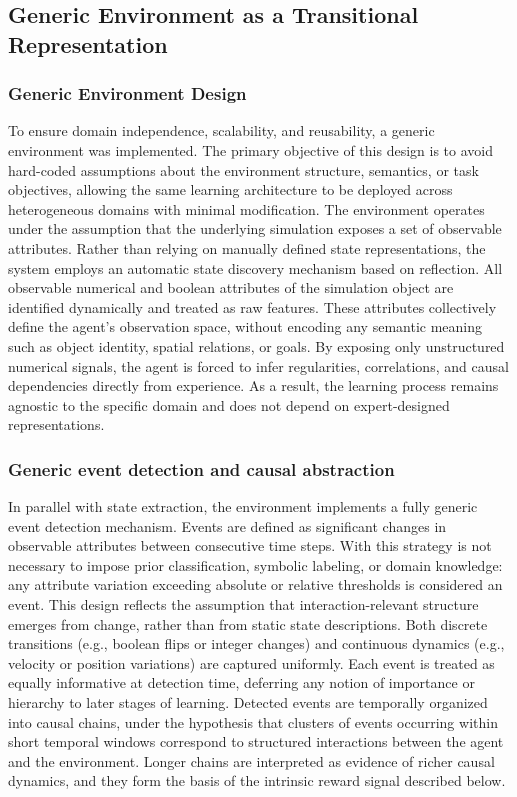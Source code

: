 \documentclass[12pt,a4paper]{report}
\begin{document}
\subsection{Generic Environment as a Transitional Representation}
\subsubsection{Generic Environment Design}
To ensure domain independence, scalability, and reusability, a generic environment was implemented. The primary objective of this design is to avoid hard-coded assumptions about the environment structure, semantics, or task objectives, allowing the same learning architecture to be deployed across heterogeneous domains with minimal modification.
The environment operates under the assumption that the underlying simulation exposes a set of observable attributes. Rather than relying on manually defined state representations, the system employs an automatic state discovery mechanism based on reflection. All observable numerical and boolean attributes of the simulation object are identified dynamically and treated as raw features. These attributes collectively define the agent's observation space, without encoding any semantic meaning such as object identity, spatial relations, or goals.
By exposing only unstructured numerical signals, the agent is forced to infer regularities, correlations, and causal dependencies directly from experience. As a result, the learning process remains agnostic to the specific domain and does not depend on expert-designed representations.

\subsubsection{Generic event detection and causal abstraction}
In parallel with state extraction, the environment implements a fully generic event detection mechanism. Events are defined as significant changes in observable attributes between consecutive time steps. With this strategy is not necessary to impose prior classification, symbolic labeling, or domain knowledge: any attribute variation exceeding absolute or relative thresholds is considered an event.
This design reflects the assumption that interaction-relevant structure emerges from change, rather than from static state descriptions. Both discrete transitions (e.g., boolean flips or integer changes) and continuous dynamics (e.g., velocity or position variations) are captured uniformly. Each event is treated as equally informative at detection time, deferring any notion of importance or hierarchy to later stages of learning.
Detected events are temporally organized into causal chains, under the hypothesis that clusters of events occurring within short temporal windows correspond to structured interactions between the agent and the environment. Longer chains are interpreted as evidence of richer causal dynamics, and they form the basis of the intrinsic reward signal described below.
\end{document}
